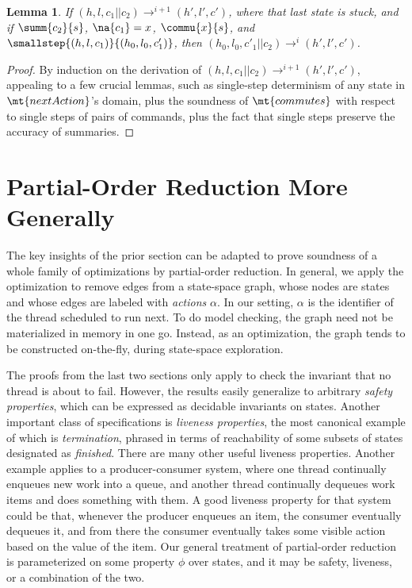 \documentclass{amsbook}
\newtheorem{lemma}[theorem]{Lemma}
\theoremstyle{definition}
\theoremstyle{remark}
\numberwithin{section}{chapter}
\numberwithin{equation}{chapter}
\begin{document}
\begin{lemma}\label{translate_trace_commute}
  If $(h, l, c_1 || c_2) \to^{i+1} (h', l', c')$, where that last state is stuck, and if $\summ{c_2}{s}$, $\na{c_1} = x$, $\commu{x}{s}$, and $\smallstep{(h, l, c_1)}{(h_0, l_0, c'_1)}$, then $(h_0, l_0, c'_1 || c_2) \to^i (h', l', c')$.
\end{lemma}
\begin{proof}
  By induction on the derivation of $(h, l, c_1 || c_2) \to^{i+1} (h', l', c')$, appealing to a few crucial lemmas, such as single-step determinism of any state in $\mt{nextAction}$'s domain, plus the soundness of $\mt{commutes}$ with respect to single steps of pairs of commands, plus the fact that single steps preserve the accuracy of summaries.
\end{proof}

\section{Partial-Order Reduction More Generally}

The key insights of the prior section can be adapted to prove soundness of a whole family of optimizations by partial-order reduction.
In general, we apply the optimization to remove edges from a state-space graph, whose nodes are states and whose edges are labeled with \emph{actions} $\alpha$.
In our setting, $\alpha$ is the identifier of the thread scheduled to run next.
To do model checking, the graph need not be materialized in memory in one go.
Instead, as an optimization, the graph tends to be constructed on-the-fly, during state-space exploration.

The proofs from the last two sections only apply to check the invariant that no thread is about to fail.
However, the results easily generalize to arbitrary \emph{safety properties}, which can be expressed as decidable invariants on states.
Another important class of specifications is \emph{liveness properties}, the most canonical example of which is \emph{termination}, phrased in terms of reachability of some subsets of states designated as \emph{finished}.
There are many other useful liveness properties.
Another example applies to a producer-consumer system, where one thread continually enqueues new work into a queue, and another thread continually dequeues work items and does something with them.
A good liveness property for that system could be that, whenever the producer enqueues an item, the consumer eventually dequeues it, and from there the consumer eventually takes some visible action based on the value of the item.
Our general treatment of partial-order reduction is parameterized on some property $\phi$ over states, and it may be safety, liveness, or a combination of the two.
\end{document}
